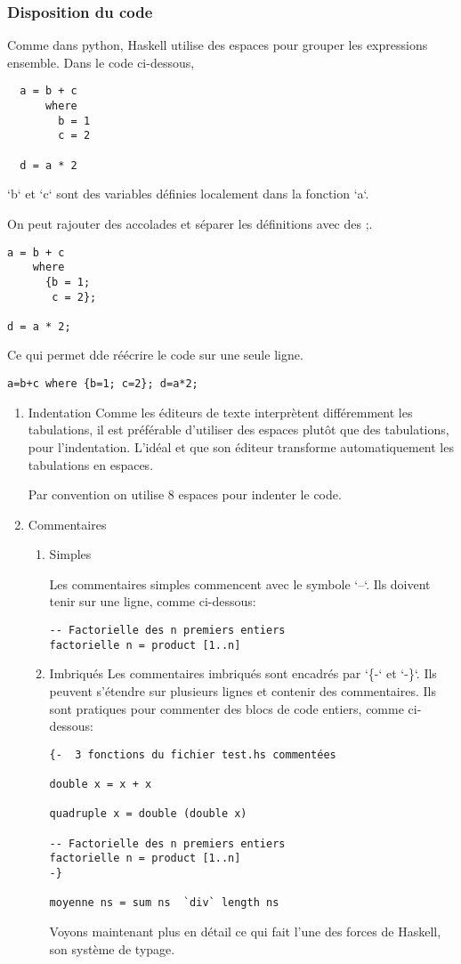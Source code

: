 \documentclass[11pt]{article}
\begin{document}
\subsubsection{Disposition du code}
\label{sec:orgd67577f}
Comme dans python,  Haskell utilise des espaces pour grouper les expressions ensemble.  Dans le code ci-dessous,
\begin{verbatim}
  a = b + c
      where
        b = 1
        c = 2

  d = a * 2
\end{verbatim}
`b` et `c` sont des variables définies localement dans la fonction `a`.

On peut rajouter des accolades et séparer les définitions avec des ;.
\begin{verbatim}
a = b + c
    where
      {b = 1;
       c = 2};

d = a * 2;
\end{verbatim}
Ce qui permet dde réécrire le code sur une seule ligne.
\begin{verbatim}
a=b+c where {b=1; c=2}; d=a*2;
\end{verbatim}

\begin{enumerate}
\item Indentation
\label{sec:org39c8b3f}
Comme les éditeurs de texte interprètent différemment les tabulations,  il est préférable d'utiliser des espaces plutôt que des tabulations, pour l'indentation.   L'idéal et que son éditeur transforme automatiquement les tabulations en espaces.

Par convention on utilise 8 espaces pour indenter le code.

\item Commentaires
\label{sec:org8b9c13d}
\begin{enumerate}
\item Simples
\label{sec:org6f5a35a}

Les commentaires simples commencent avec le symbole `--`.   Ils doivent tenir sur une ligne, comme ci-dessous:
\begin{verbatim}
-- Factorielle des n premiers entiers
factorielle n = product [1..n]
\end{verbatim}

\item Imbriqués
\label{sec:orgb278237}
Les commentaires imbriqués sont encadrés par `\{-` et `-\}`.
Ils peuvent s'étendre sur plusieurs lignes et contenir des commentaires.   Ils sont pratiques pour commenter  des blocs de code entiers, comme ci-dessous:
\begin{verbatim}
{-  3 fonctions du fichier test.hs commentées

double x = x + x

quadruple x = double (double x)

-- Factorielle des n premiers entiers
factorielle n = product [1..n]
-}

moyenne ns = sum ns  `div` length ns 
\end{verbatim}

Voyons maintenant plus en détail ce qui fait l'une des forces de Haskell, son système de typage.
\end{enumerate}
\end{enumerate}
\end{document}
